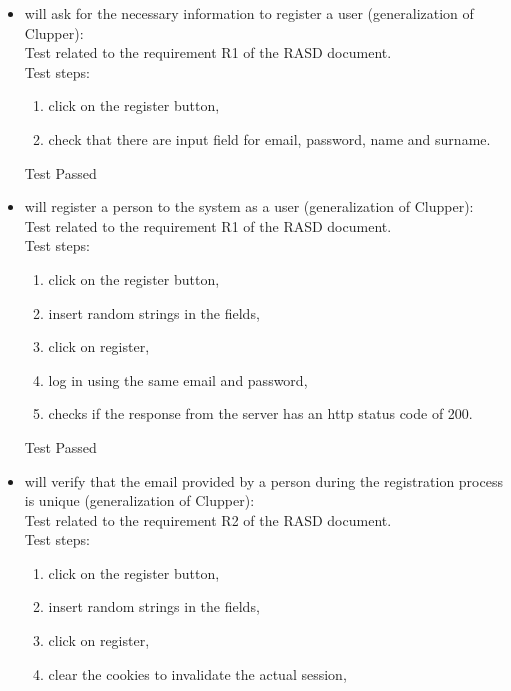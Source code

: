 \begin{itemize}
    \item will ask for the necessary information to register a user (generalization of Clupper): \\
    Test related to the requirement R1 of the RASD document. \\
    Test steps:
    \begin{enumerate}
        \item click on the register button,
        \item check that there are input field for email, password, name and surname.
    \end{enumerate}
    Test Passed \\

    \item will register a person to the system as a user (generalization of Clupper): \\
    Test related to the requirement R1 of the RASD document. \\
    Test steps:
    \begin{enumerate}
        \item click on the register button,
        \item insert random strings in the fields,
        \item click on register,
        \item log in using the same email and password,
        \item checks if the response from the server has an http status code of 200.
    \end{enumerate}
    Test Passed \\

    \item will verify that the email provided by a person during the registration process is unique (generalization of Clupper):\\
    Test related to the requirement R2 of the RASD document. \\
    Test steps:
    \begin{enumerate}

        \item click on the register button,

        \item insert random strings in the fields,

        \item click on register,

        \item clear the cookies to invalidate the actual session,


\end{enumerate}
\end{itemize}
